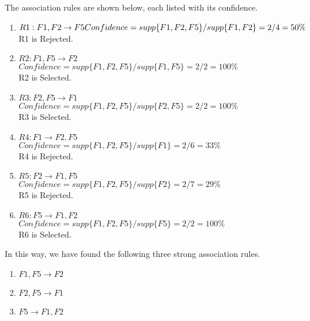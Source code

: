 The association rules are shown below, each listed with its confidence.
\begin{enumerate}
\item $R1: F1, F2 \rightarrow F5 \\
Confidence = supp\{F1, F2, F5\} / supp\{F1, F2\} = 2 / 4 = 50 \% $ \\
R1 is Rejected.
\item $R2: F1, F5 \rightarrow F2$\\
$Confidence = supp\{F1, F2, F5\} / supp\{F1, F5\} = 2 / 2 = 100 \% $\\
R2 is Selected.
\item $R3: F2, F5 \rightarrow F1$\\
$Confidence = supp\{F1, F2, F5\} / supp\{F2, F5\} = 2 / 2 = 100 \% $\\
R3 is Selected.
\item $R4: F1 \rightarrow F2, F5$\\
$Confidence = supp\{F1, F2, F5\} / supp\{F1\} = 2 / 6 = 33 \% $\\
R4 is Rejected.
\item $R5: F2 \rightarrow F1, F5$\\
$Confidence = supp\{F1, F2, F5\} / supp\{F2\} = 2 / 7 = 29 \% $\\
R5 is Rejected.
\item $R6: F5 \rightarrow F1, F2$\\
$Confidence = supp\{F1, F2, F5\} / supp\{F5\} = 2 / 2 = 100 \% $\\
R6 is Selected.
\end{enumerate}

In this way, we have found the following three strong association rules.
\begin{enumerate}
\item $F1, F5 \rightarrow  F2$
\item $F2, F5 \rightarrow  F1$
\item $F5 \rightarrow  F1, F2$
\end{enumerate}
